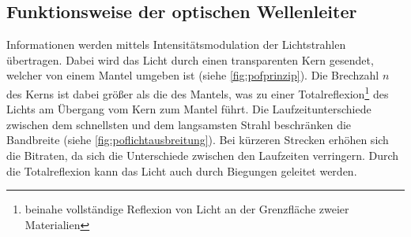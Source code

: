 \subsection{Funktionsweise der optischen Wellenleiter}
\label{subsec:poffunktionsweise}

Informationen werden mittels Intensitätsmodulation der Lichtstrahlen übertragen.
Dabei wird das Licht durch einen transparenten Kern gesendet, welcher von einem
Mantel umgeben ist (siehe \autoref{fig:pofprinzip}). Die Brechzahl $n$ des
Kerns ist dabei größer als die des Mantels, was zu einer
Totalreflexion\footnote{beinahe vollständige Reflexion von Licht an der
Grenzfläche zweier Materialien} des Lichts am Übergang vom Kern zum Mantel
führt. Die Laufzeitunterschiede zwischen dem schnellsten und dem langsamsten
Strahl beschränken die Bandbreite (siehe \autoref{fig:poflichtausbreitung}). Bei
kürzeren Strecken erhöhen sich die Bitraten, da sich die Unterschiede zwischen
den Laufzeiten verringern. Durch die Totalreflexion kann das Licht auch durch
Biegungen geleitet werden. \cite{pofacprinzip}

